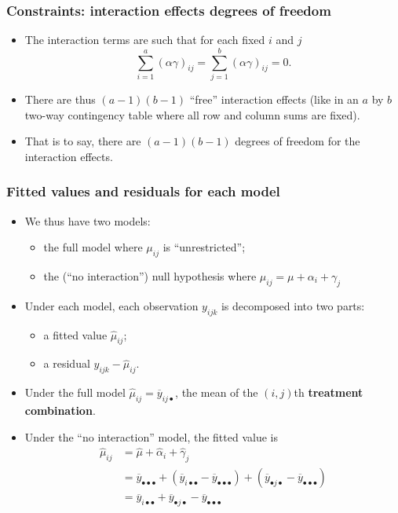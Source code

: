\documentclass[a4paper]{article}
\begin{document}
\subsubsection{Constraints: interaction effects degrees of freedom}
\begin{itemize}
	\item The interaction terms are such that for each fixed \( i \) and \( j \)
	\[
	\sum_{i=1}^{a} (\alpha \gamma)_{ij} = \sum_{j=1}^{b} (\alpha \gamma)_{ij} = 0.
	\]
	\item There are thus \( (a-1)(b-1) \) ``free''  interaction effects (like in an \( a \) by \( b \) two-way contingency table where all row and column sums are fixed).
	\item That is to say, there are \( (a-1)(b-1) \) degrees of freedom for the interaction effects.
\end{itemize}  
\subsubsection{Fitted values and residuals for each model}
\begin{itemize}
	\item We thus have two models:
	\begin{itemize}
		\item the full model where \( \mu_{ij} \) is ``unrestricted'';
		\item the (``no interaction'') null hypothesis where \( \mu_{ij}=\mu+\alpha_i+\gamma_j \)
	\end{itemize}
	\item Under each model, each observation \( y_{ijk} \) is decomposed into two parts:
	\begin{itemize}
		\item a fitted value \( \hat{\mu}_{ij} \);
		\item a residual \( y_{ijk} - \hat{\mu}_{ij} \).
	\end{itemize}
	\item Under the full model \( \hat{\mu}_{ij} = \overline{y}_{ij\bullet} \), the mean of the \( (i,j) \)th \textbf{treatment combination}.
	\item Under the ``no interaction'' model, the fitted value is
	\begin{align*}
		\hat\mu_{ij} &= \hat\mu + \hat{\alpha}_i+ \hat{\gamma}_j \\
		&= \overline y_{\bullet\bullet\bullet}+(\overline y_{i\bullet\bullet}-\overline y_{\bullet\bullet\bullet}) + (\overline y_{\bullet j\bullet}-\overline y_{\bullet\bullet\bullet}) \\
		&= \overline y_{i\bullet\bullet}+\overline y_{\bullet j \bullet}- \overline y_{\bullet\bullet\bullet}
	\end{align*}
\end{itemize}
\end{document}
